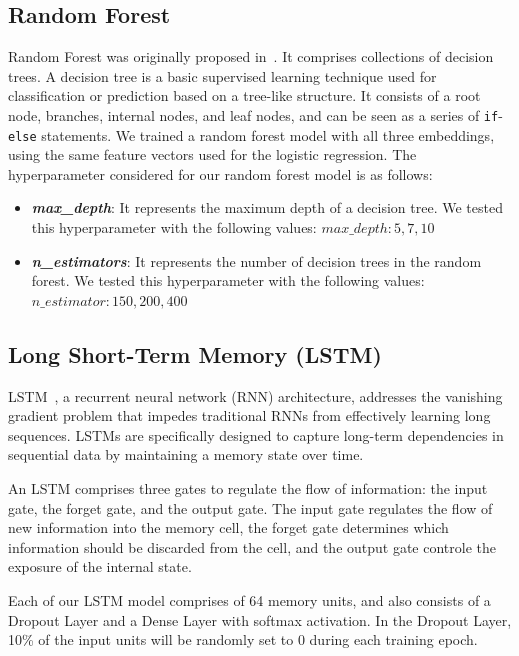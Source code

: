 \documentclass[conference]{IEEEtran}
\begin{document}
\subsection{Random Forest}
Random Forest was originally proposed in~\cite{randomforestorig}. 
It comprises collections of decision trees. A decision tree is a basic supervised learning technique used for classification or prediction based on a tree-like structure. It consists of a root node, branches, internal nodes, and leaf nodes, and can be seen as a series of \texttt{if}-\texttt{else} statements. We trained a random forest model with all three embeddings, using the same feature vectors used for the logistic regression. The hyperparameter considered for our random forest model is as follows:
\begin{itemize}
    \item \textbf{\textit{max\_depth}}: It represents the maximum depth of a decision tree. We tested this hyperparameter with the following values: $max\_depth: {5, 7, 10}$
    \item \textbf{\textit{n\_estimators}}: It represents the number of decision trees in the random forest. We tested this hyperparameter with the following values: $n\_estimator: {150, 200, 400}$
\end{itemize}

\subsection{Long Short-Term Memory (LSTM)}
LSTM~\cite{lstm}, a recurrent neural network (RNN) architecture, addresses the vanishing gradient problem that impedes traditional RNNs from effectively learning long sequences. LSTMs are specifically designed to capture long-term dependencies in sequential data by maintaining a memory state over time.

An LSTM comprises three gates to regulate the flow of information: the input gate, the forget gate, and the output gate. The input gate regulates the flow of new information into the memory cell, the forget gate determines which information should be discarded from the cell, and the output gate controle the exposure of the internal state. 

Each of our LSTM model comprises of 64 memory units, and also consists of a Dropout Layer and a Dense Layer with softmax activation. In the Dropout Layer, 10\% of the input units will be randomly set to 0 during each training epoch.
\end{document}
